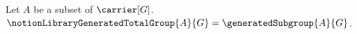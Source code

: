 

\begin{definition}\label{notion_library_generated_total_group}
    Let $A$ be a subset of $\carrier[G]$.
    $\notionLibraryGeneratedTotalGroup{A}{G}=\generatedSubgroup{A}{G}$.
\end{definition}
